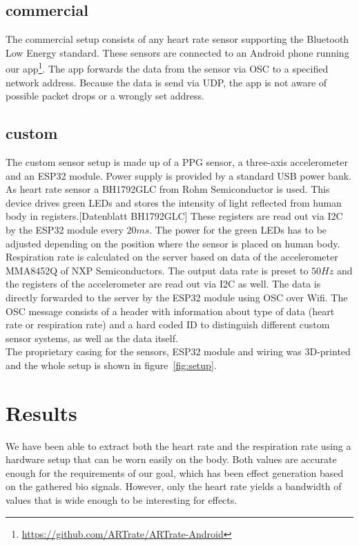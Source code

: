 \documentclass{sigchi-ext}
\begin{document}
\subsection{commercial}

The commercial setup consists of any heart rate sensor supporting the Bluetooth Low Energy
standard. These sensors are connected to an Android phone running our app\footnote{\url{https://github.com/ARTrate/ARTrate-Android}}.
The app forwards the data from the sensor via OSC to a specified network address.
Because the data is send via UDP, the app is not aware of possible packet drops or a wrongly set address.

\subsection{custom}
The custom sensor setup is made up of a PPG sensor, a three-axis accelerometer and an ESP32 module. Power supply
is provided by a standard USB power bank. As heart rate sensor a BH1792GLC from Rohm Semiconductor is used.
This device drives green LEDs and stores the intensity of light reflected from human body in registers.[Datenblatt BH1792GLC]
These registers are read out via I2C by the ESP32 module every $20ms$. The power for the green LEDs has to
be adjusted depending on the position where the sensor is placed on human body. \\
Respiration rate is calculated on the server based on data of the accelerometer MMA8452Q of NXP Semiconductors.
The output data rate is preset to $50Hz$ and the registers of the accelerometer are read out via I2C as well.
The data is directly forwarded to the server by the ESP32 module using OSC over Wifi. The OSC message consists of a
header with information about type of data (heart rate or respiration rate) and a hard coded ID to distinguish
different custom sensor systems, as well as the data itself. \\
The proprietary casing for the sensors, ESP32 module and wiring was 3D-printed and the whole setup is shown in figure~\ref{fig:setup}.

\section{Results}

We have been able to extract both the heart rate and the respiration rate using a hardware setup that can be
worn easily on the body. Both values are accurate enough for the requirements of our goal, which has been
effect generation based on the gathered bio signals. However, only the heart rate yields a bandwidth of values
that is wide enough to be interesting for effects.
\end{document}
